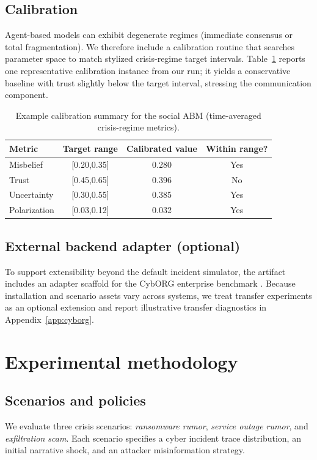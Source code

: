 \documentclass[sn-basic]{sn-jnl}
\begin{document}
\subsection{Calibration}
Agent-based models can exhibit degenerate regimes (immediate consensus or total fragmentation). We therefore include a calibration routine that searches parameter space to match stylized crisis-regime target intervals. Table~\ref{tab:calibration} reports one representative calibration instance from our run; it yields a conservative baseline with trust slightly below the target interval, stressing the communication component.

\begin{table}[t]
\centering
\caption{Example calibration summary for the social ABM (time-averaged crisis-regime metrics).}
\label{tab:calibration}
\small
\begin{tabular}{lccc}
\toprule
Metric & Target range & Calibrated value & Within range? \\
\midrule
Misbelief & [0.20,0.35] & 0.280 & Yes \\
Trust & [0.45,0.65] & 0.396 & No \\
Uncertainty & [0.30,0.55] & 0.385 & Yes \\
Polarization & [0.03,0.12] & 0.032 & Yes \\
\bottomrule
\end{tabular}
\end{table}

\subsection{External backend adapter (optional)}
To support extensibility beyond the default incident simulator, the artifact includes an adapter scaffold for the CybORG enterprise benchmark \citep{baillie2020cyborg,standen2021cyborg,emerson2024cyborgpp}. Because installation and scenario assets vary across systems, we treat transfer experiments as an optional extension and report illustrative transfer diagnostics in Appendix~\ref{app:cyborg}.

\section{Experimental methodology}
\subsection{Scenarios and policies}
We evaluate three crisis scenarios: \emph{ransomware rumor}, \emph{service outage rumor}, and \emph{exfiltration scam}. Each scenario specifies a cyber incident trace distribution, an initial narrative shock, and an attacker misinformation strategy.
\end{document}
